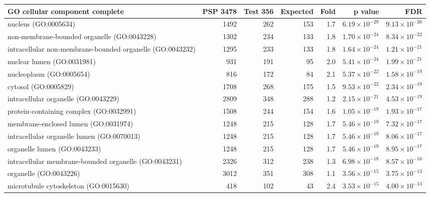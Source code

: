 \begin{table}[ht]
\centering
\begin{adjustbox}{width=\textwidth}
\begin{tabular}{lrrrrrr}
  \hline
GO cellular component complete & PSP 3478 & Test 356 & Expected & Fold & p value & FDR \\ 
  \hline
nucleus (GO:0005634) & 1492 & 262 & 153 & 1.7 & $6.19 \times 10^{-29}$ & $9.13 \times 10^{-26}$ \\ 
  non-membrane-bounded organelle (GO:0043228) & 1302 & 234 & 133 & 1.8 & $1.70 \times 10^{-24}$ & $8.34 \times 10^{-22}$ \\ 
  intracellular non-membrane-bounded organelle (GO:0043232) & 1295 & 233 & 133 & 1.8 & $1.64 \times 10^{-24}$ & $1.21 \times 10^{-21}$ \\ 
  nuclear lumen (GO:0031981) & 931 & 191 & 95 & 2.0 & $5.41 \times 10^{-24}$ & $1.99 \times 10^{-21}$ \\ 
  nucleoplasm (GO:0005654) & 816 & 172 & 84 & 2.1 & $5.37 \times 10^{-22}$ & $1.58 \times 10^{-19}$ \\ 
  cytosol (GO:0005829) & 1708 & 268 & 175 & 1.5 & $9.53 \times 10^{-22}$ & $2.34 \times 10^{-19}$ \\ 
  intracellular organelle (GO:0043229) & 2809 & 348 & 288 & 1.2 & $2.15 \times 10^{-21}$ & $4.53 \times 10^{-19}$ \\ 
  protein-containing complex (GO:0032991) & 1508 & 244 & 154 & 1.6 & $1.05 \times 10^{-19}$ & $1.93 \times 10^{-17}$ \\ 
  membrane-enclosed lumen (GO:0031974) & 1248 & 215 & 128 & 1.7 & $5.46 \times 10^{-19}$ & $7.32 \times 10^{-17}$ \\ 
  intracellular organelle lumen (GO:0070013) & 1248 & 215 & 128 & 1.7 & $5.46 \times 10^{-19}$ & $8.06 \times 10^{-17}$ \\ 
  organelle lumen (GO:0043233) & 1248 & 215 & 128 & 1.7 & $5.46 \times 10^{-19}$ & $8.95 \times 10^{-17}$ \\ 
  intracellular membrane-bounded organelle (GO:0043231) & 2326 & 312 & 238 & 1.3 & $6.98 \times 10^{-18}$ & $8.57 \times 10^{-16}$ \\ 
  organelle (GO:0043226) & 3012 & 351 & 308 & 1.1 & $3.56 \times 10^{-15}$ & $3.75 \times 10^{-13}$ \\ 
  microtubule cytoskeleton (GO:0015630) & 418 & 102 & 43 & 2.4 & $3.53 \times 10^{-15}$ & $4.00 \times 10^{-13}$ \\ 

\end{tabular}
\end{adjustbox}
\end{table}
